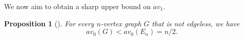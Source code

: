 \documentclass[a4paper,12pt]{amsart}
\newtheorem{proposition}[lemma]{Proposition}
\theoremstyle{remark}
\begin{document}


\medskip
We now aim to obtain a sharp upper bound on $av_1$.

\begin{proposition}[\cite{andriantiana2018}]
\label{Pro:avo}
For every $n$-vertex graph $G$ that is not edgeless, we have
$$av_0(G) < av_0(E_n) = n/2.$$
\end{proposition}
\end{document}
